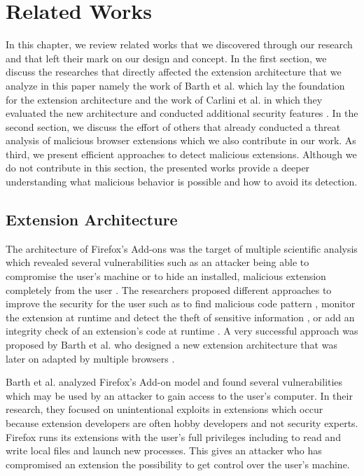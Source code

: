 
\chapter{Related Works}

	In this chapter, we review related works that we discovered through our research and that left their mark on our design and concept. In the first section, we discuss the researches that directly affected the extension architecture that we analyze in this paper namely the work of Barth et al. which lay the foundation for the extension architecture and the work of Carlini et al. in which they evaluated the new architecture and conducted additional security features \cite{Barth10protectingbrowsers, Carlini:2012:EGC:2362793.2362800}. In the second section, we discuss the effort of others that already conducted a threat analysis of malicious browser extensions which we also contribute in our work. As third, we present efficient approaches to detect malicious extensions. Although we do not contribute in this section, the presented works provide a deeper understanding what malicious behavior is possible and how to avoid its detection.

\section{Extension Architecture}

	The architecture of Firefox's Add-ons was the target of multiple scientific analysis which revealed several vulnerabilities such as an attacker being able to compromise the user's machine or to hide an installed, malicious extension completely from the user \cite{Bandhakavi:2011:VBE:1995376.1995398, TerLouw:2007:EWB:1420581.1420583}. The researchers proposed different approaches to improve the security for the user such as to find malicious code pattern \cite{Bandhakavi:2011:VBE:1995376.1995398}, monitor the extension at runtime and detect the theft of sensitive information \cite{Dhawan:2009:AIF:1723192.1723250, cs2015sentinel, TerLouw:2007:EWB:1420581.1420583}, or add an integrity check of an extension's code at runtime \cite{TerLouw:2007:EWB:1420581.1420583}. A very successful approach was proposed by Barth et al. who designed a new extension architecture that was later on adapted by multiple browsers \cite{Barth10protectingbrowsers}. 
	
	Barth et al. analyzed Firefox's Add-on model and found several vulnerabilities which may be used by an attacker to gain access to the user's computer. In their research, they focused on unintentional exploits in extensions which occur because extension developers are often hobby developers and not security experts. Firefox runs its extensions with the user's full privileges including to read and write local files and launch new processes. This gives an attacker who has compromised an extension the possibility to get control over the user's machine. 
	
